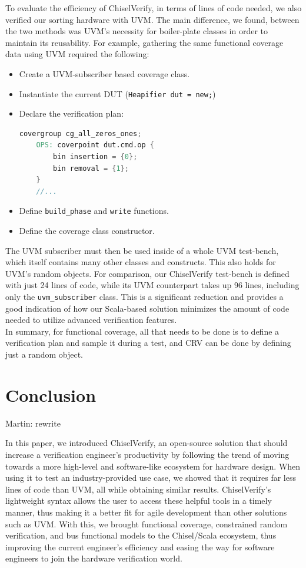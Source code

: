 \documentclass[conference]{IEEEtran}
\newcommand{\martin}[1]{{\color{blue} Martin: #1}}
\begin{document}
To evaluate the efficiency of ChiselVerify, in terms of lines of code needed, we also verified our sorting hardware with UVM.
The main difference, we found, between the two methods was UVM's necessity for boiler-plate classes in order to maintain its reusability.
For example, gathering the same functional coverage data using UVM required the following: 
\begin{itemize}
    \item Create a UVM-subscriber based coverage class.
    \item Instantiate the current DUT (\texttt{Heapifier dut = new;})
    \item Declare the verification plan: 
    \begin{lstlisting}[language=verilog]
	covergroup cg_all_zeros_ones;
	OPS: coverpoint dut.cmd.op {
		bin insertion = {0};
		bin removal = {1};
	}
	//...
    \end{lstlisting}
    \item Define \texttt{build\_phase} and \texttt{write} functions.
    \item Define the coverage class constructor.
\end{itemize}  
The UVM subscriber must then be used inside of a whole UVM test-bench, which itself contains many other classes and constructs.
This also holds for UVM's random objects.
For comparison, our ChiselVerify test-bench is defined with just 24 lines of code,
while its UVM counterpart takes up 96 lines, including only the \texttt{uvm\_subscriber} class.
This is a significant reduction and provides a good indication of how our Scala-based solution minimizes the amount of code needed to utilize advanced verification features. \\
In summary, for functional coverage, all that needs to be done is to define a verification plan and sample it during a test, and
CRV can be done by defining just a random object. 

\section{Conclusion}
\label{sec:conclude}

\martin{rewrite}

In this paper, we introduced ChiselVerify, an open-source solution that should increase a verification engineer's productivity by following the trend of moving towards a more high-level and software-like ecosystem for hardware design. 
When using it to test an industry-provided use case, we showed that it requires far less lines of code than UVM, all while obtaining similar results.
ChiselVerify's lightweight syntax allows the user to access these helpful tools in a timely manner, thus making it a better fit for agile development than other solutions such as UVM.
With this, we brought functional coverage, constrained random verification, and bus functional models to the Chisel/Scala ecosystem, thus improving the current engineer's efficiency and easing the way for software engineers to join the hardware verification world.
\end{document}
